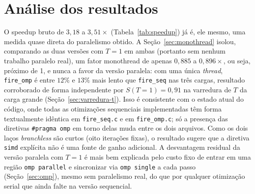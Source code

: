 \documentclass[11pt,a4paper]{article}
\begin{document}
\section{Análise dos resultados}
\label{sec:analise}

O speedup bruto de $3{,}18$ a $3{,}51\times$ (Tabela~\ref{tab:speedup}) já é, ele mesmo, uma medida quase direta do paralelismo obtido. A Seção~\ref{sec:monothread} isolou, comparando as duas versões com $T=1$ em ambas (portanto sem nenhum trabalho paralelo real), um fator monothread de apenas $0{,}885$ a $0{,}896\times$, ou seja, próximo de 1, e nunca a favor da versão paralela: com uma única \emph{thread}, \texttt{fire\_omp} é entre $12\%$ e $13\%$ mais lento que \texttt{fire\_seq} nas três cargas, resultado corroborado de forma independente por $S(T{=}1)=0{,}91$ na varredura de $T$ da carga grande (Seção~\ref{sec:varredura-t}). Isso é consistente com o estado atual do código, onde todas as otimizações sequenciais implementadas têm forma textualmente idêntica em \texttt{fire\_seq.c} e em \texttt{fire\_omp.c}; só a presença das diretivas \texttt{\#pragma omp} em torno delas muda entre os dois arquivos. Como os dois laços \emph{branchless} são curtos (oito iterações fixas), o resultado sugere que a diretiva \texttt{simd} explícita não é uma fonte de ganho adicional. A desvantagem residual da versão paralela com $T=1$ é mais bem explicada pelo custo fixo de entrar em uma região \texttt{omp parallel} e sincronizar via \texttt{omp single} a cada passo (Seção~\ref{sec:omp}), mesmo sem paralelismo real, do que por qualquer otimização serial que ainda falte na versão sequencial.
\end{document}
